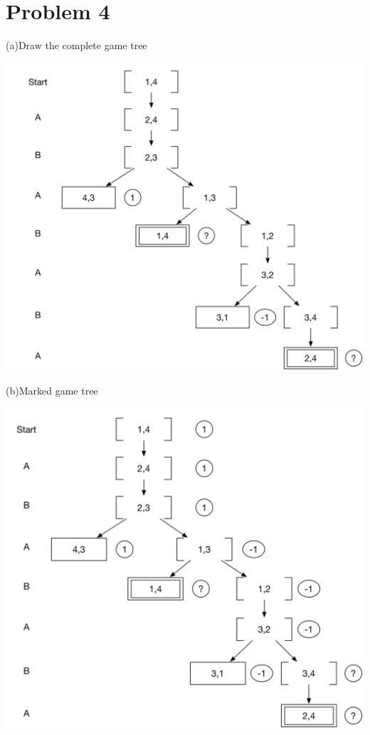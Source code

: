 \documentclass[12pt]{amsart}
\begin{document}
\section*{Problem 4}
(a)Draw the complete game tree


\includegraphics[width=\textwidth]{Problem4a.png}

\newpage
(b)Marked game tree


\includegraphics[width=\textwidth]{Problem4b.png}
\end{document}
